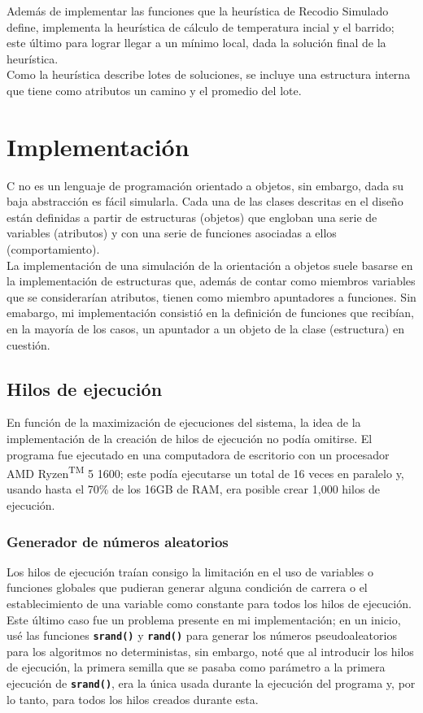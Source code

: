 \documentclass[a4paper]{report}
\begin{document}
Adem\'as de implementar las funciones que la heur\'istica de Recodio Simulado define, implementa la
heur\'istica de c\'alculo de temperatura incial y el barrido; este \'ultimo para lograr llegar
a un m\'inimo local, dada la soluci\'on final de la heur\'istica.\\

Como la heur\'istica describe lotes de soluciones, se incluye una estructura interna que tiene como
atributos un camino y el promedio del lote.\\

\chapter{Implementaci\'on}
C no es un lenguaje de programaci\'on orientado a objetos, sin embargo, dada su baja abstracci\'on
es f\'acil simularla. Cada una de las clases descritas en el dise\~no est\'an definidas a partir de
estructuras (objetos) que engloban una serie de variables (atributos) y con una serie de funciones
asociadas a ellos (comportamiento).\\

La implementaci\'on de una simulaci\'on de la orientaci\'on a objetos suele basarse en la implementaci\'on
de estructuras que, adem\'as de contar como miembros variables que se considerar\'ian atributos,
tienen como miembro apuntadores a funciones. Sin emabargo, mi implementaci\'on consisti\'o en la definici\'on
de funciones que recib\'ian, en la mayor\'ia de los casos, un apuntador a un objeto de la clase (estructura)
en cuesti\'on.\\

\section{Hilos de ejecuci\'on}
En funci\'on de la maximizaci\'on de ejecuciones del sistema, la idea de la implementaci\'on de la creaci\'on
de hilos de ejecuci\'on no pod\'ia omitirse. El programa fue ejecutado en una computadora de escritorio
con un procesador AMD Ryzen\textsuperscript{TM} 5 1600; este pod\'ia ejecutarse un total de 16 veces
en paralelo y, usando hasta el 70\% de los 16GB de RAM, era posible crear 1,000 hilos de ejecuci\'on.

\subsection{Generador de n\'umeros aleatorios}
Los hilos de ejecuci\'on tra\'ian consigo la limitaci\'on en el uso de variables o funciones globales
que pudieran generar alguna condici\'on de carrera o el establecimiento de una variable como constante
para todos los hilos de ejecuci\'on. Este \'ultimo caso fue un problema presente en mi implementaci\'on;
en un inicio, us\'e las funciones \textbf{\texttt{srand()}} y \textbf{\texttt{rand()}} para generar
los n\'umeros pseudoaleatorios para los algoritmos no deterministas, sin embargo, not\'e que al introducir
los hilos de ejecuci\'on, la primera semilla que se pasaba como par\'ametro a la primera ejecuci\'on
de \textbf{\texttt{srand()}}, era la \'unica usada durante la ejecuci\'on del programa y, por lo tanto,
para todos los hilos creados durante esta.\\
\end{document}
